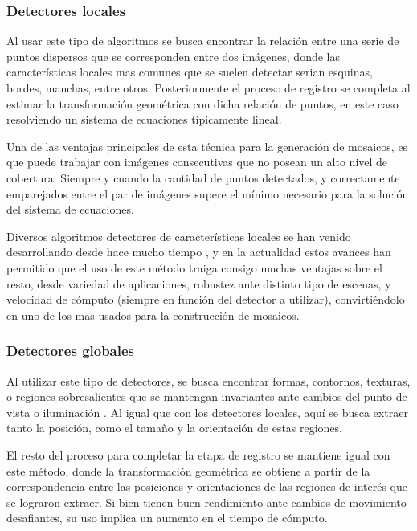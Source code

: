 \subsubsection*{Detectores locales}

Al usar este tipo de algoritmos se busca encontrar la relación entre una serie de puntos dispersos que se corresponden entre dos imágenes, donde las características locales mas comunes que se suelen detectar serian esquinas, bordes, manchas, entre otros. Posteriormente el proceso de registro se completa al estimar la transformación geométrica con dicha relación de puntos, en este caso resolviendo un sistema de ecuaciones típicamente lineal.

Una de las ventajas principales de esta técnica para la generación de mosaicos, es que puede trabajar con imágenes consecutivas que no posean un alto nivel de cobertura. Siempre y cuando la cantidad de puntos detectados, y correctamente emparejados entre el par de imágenes supere el mínimo necesario para la solución del sistema de ecuaciones.

Diversos algoritmos detectores de características locales se han venido desarrollando desde hace mucho tiempo \cite{harris,sift,surf,fast,brief,orb,kaze,akaze}, y en la actualidad estos avances han permitido que el uso de este método traiga consigo muchas ventajas sobre el resto, desde variedad de aplicaciones, robustez ante distinto tipo de escenas, y velocidad de cómputo (siempre en función del detector a utilizar), convirtiéndolo en uno de los mas usados para la construcción de mosaicos.

\subsubsection*{Detectores globales}

Al utilizar este tipo de detectores, se busca encontrar formas, contornos, texturas, o regiones sobresalientes que se mantengan invariantes ante cambios del punto de vista o iluminación \cite{high-level}. Al igual que con los detectores locales, aquí se busca extraer tanto la posición, como el tamaño y la orientación de estas regiones.

El resto del proceso para completar la etapa de registro se mantiene igual con este método, donde la transformación geométrica se obtiene a partir de la correspondencia entre las posiciones y orientaciones de las regiones de interés que se lograron extraer. Si bien tienen buen rendimiento ante cambios de movimiento desafiantes, su uso implica un aumento en el tiempo de cómputo.

